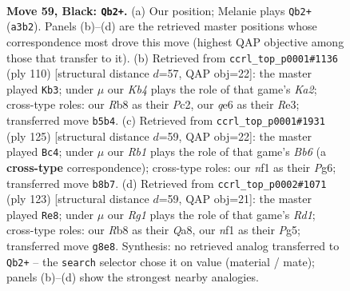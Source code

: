 \documentclass[11pt]{article}
\begin{document}
\clearpage

\begin{figure}[p]\centering
\begin{subfigure}{0.46\textwidth}\centering
\resizebox{\linewidth}{!}{%
\newchessgame
\chessboard[
  setfen={1r4r1/p5p1/4Q2p/1k1p3P/p2P2P1/q3P3/7K/4bN2 b - - 27 59},
  showmover=false,
  pgfstyle=straightmove, color=movearrow, markmove={a3-b2}
]}
\caption{}
\end{subfigure}\hfill
\begin{subfigure}{0.46\textwidth}\centering
\resizebox{\linewidth}{!}{%
\newchessgame
\chessboard[
  setfen={8/p4p1k/5qp1/2P4p/5P2/P1R1R1P1/K1P1p3/8 w - - 20 56},
  showmover=false,
  pgfstyle=straightmove, color=movearrow, markmove={a2-b3}
]}
\caption{}
\end{subfigure}
\\[4pt]
\begin{subfigure}{0.46\textwidth}\centering
\resizebox{\linewidth}{!}{%
\newchessgame
\chessboard[
  setfen={8/kr3p2/2Q1p1p1/p2pP3/P4P2/1b2P1K1/8/8 b - - 0 63},
  showmover=false,
  pgfstyle=straightmove, color=movearrow, markmove={b3-c4}
]}
\caption{}
\end{subfigure}\hfill
\begin{subfigure}{0.46\textwidth}\centering
\resizebox{\linewidth}{!}{%
\newchessgame
\chessboard[
  setfen={q2r2k1/4Qp2/4pP1p/1p2P1p1/1P6/7P/5N2/5BK1 b - - 9 62},
  showmover=false,
  pgfstyle=straightmove, color=movearrow, markmove={d8-e8}
]}
\caption{}
\end{subfigure}
\caption{\textbf{Move 59, Black: \texttt{Qb2+}.} (a) Our position; Melanie plays \texttt{Qb2+} (\texttt{a3b2}). Panels (b)--(d) are the retrieved master positions whose correspondence most drove this move (highest QAP objective among those that transfer to it). (b) Retrieved from \texttt{ccrl\_top\_p0001\#1136} (ply 110) [structural distance $d$=57, QAP obj=22]: the master played \texttt{Kb3}; under $\mu$ our \emph{Kb4} plays the role of that game's \emph{Ka2}; cross-type roles: our \emph{R}b8 as their \emph{P}c2, our \emph{q}e6 as their \emph{R}e3; transferred move \texttt{b5b4}. (c) Retrieved from \texttt{ccrl\_top\_p0001\#1931} (ply 125) [structural distance $d$=59, QAP obj=22]: the master played \texttt{Bc4}; under $\mu$ our \emph{Rb1} plays the role of that game's \emph{Bb6} (a \textbf{cross-type} correspondence); cross-type roles: our \emph{n}f1 as their \emph{P}g6; transferred move \texttt{b8b7}. (d) Retrieved from \texttt{ccrl\_top\_p0002\#1071} (ply 123) [structural distance $d$=59, QAP obj=21]: the master played \texttt{Re8}; under $\mu$ our \emph{Rg1} plays the role of that game's \emph{Rd1}; cross-type roles: our \emph{R}b8 as their \emph{Q}a8, our \emph{n}f1 as their \emph{P}g5; transferred move \texttt{g8e8}. Synthesis: no retrieved analog transferred to \texttt{Qb2+} -- the \texttt{search} selector chose it on value (material / mate); panels (b)--(d) show the strongest nearby analogies.}
\label{fig:thought-m117}
\end{figure}
\end{document}
